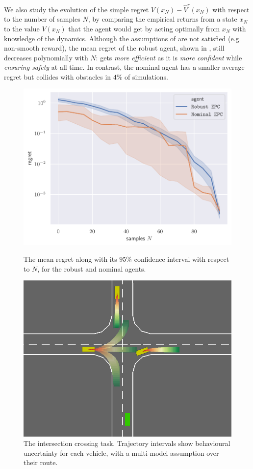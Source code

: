 \documentclass{article}
\begin{document}
We also study the evolution of the simple regret $V(x_N) - \hat{V}^r(x_N)$ with respect to the number of samples $N$, by comparing the empirical returns from a state $x_N$ to the value $V(x_N)$ that the agent would get by acting optimally from $x_N$ with knowledge of the dynamics. Although the assumptions of  are not satisfied (e.g. non-smooth reward), the mean regret of the robust agent, shown in , still decreases polynomially with $N$:  gets \emph{more efficient} as it is \emph{more confident} while \emph{ensuring safety} at all time. In contrast, the nominal agent has a smaller average regret but collides with obstacles in $4\%$ of simulations. 

\begin{figure}[!tbp]
	\centering
	\begin{minipage}[t]{0.43\textwidth}
		\centering
		\includegraphics[trim={0 0.2cm 0 0.2cm}, clip, width=0.9\linewidth]{img/regret.pdf}
		\caption{The mean regret along with its $95\%$ confidence interval with respect to $N$, for the robust and nominal agents.}
		\label{fig:regret}
	\end{minipage}
	\hfill
	\begin{minipage}[t]{0.55\textwidth}
		\centering
		\includegraphics[width=0.65\linewidth]{img/highway-small}
		\caption{The intersection crossing task. Trajectory intervals show behavioural uncertainty for each vehicle, with a multi-model assumption over their route.}
	\end{minipage}
\end{figure}
\end{document}
